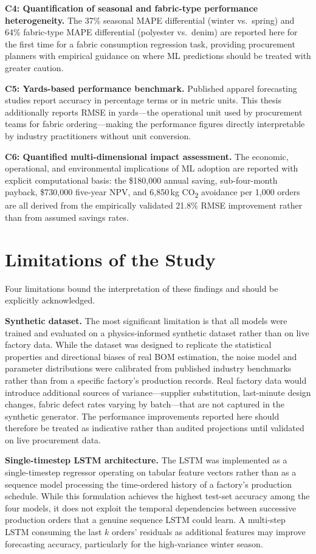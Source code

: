 \textbf{C4: Quantification of seasonal and fabric-type performance heterogeneity.} The 37\% seasonal MAPE differential (winter vs.\ spring) and 64\% fabric-type MAPE differential (polyester vs.\ denim) are reported here for the first time for a fabric consumption regression task, providing procurement planners with empirical guidance on where ML predictions should be treated with greater caution.

\textbf{C5: Yards-based performance benchmark.} Published apparel forecasting studies report accuracy in percentage terms or in metric units. This thesis additionally reports RMSE in yards---the operational unit used by procurement teams for fabric ordering---making the performance figures directly interpretable by industry practitioners without unit conversion.

\textbf{C6: Quantified multi-dimensional impact assessment.} The economic, operational, and environmental implications of ML adoption are reported with explicit computational basis: the \$180{,}000 annual saving, sub-four-month payback, \$730{,}000 five-year NPV, and 6{,}850\,kg CO\textsubscript{2} avoidance per 1{,}000 orders are all derived from the empirically validated 21.8\% RMSE improvement rather than from assumed savings rates.

\secdiv
\section{Limitations of the Study}
Four limitations bound the interpretation of these findings and should be explicitly acknowledged.

\textbf{Synthetic dataset.} The most significant limitation is that all models were trained and evaluated on a physics-informed synthetic dataset rather than on live factory data. While the dataset was designed to replicate the statistical properties and directional biases of real BOM estimation, the noise model and parameter distributions were calibrated from published industry benchmarks rather than from a specific factory's production records. Real factory data would introduce additional sources of variance---supplier substitution, last-minute design changes, fabric defect rates varying by batch---that are not captured in the synthetic generator. The performance improvements reported here should therefore be treated as indicative rather than audited projections until validated on live procurement data.

\textbf{Single-timestep LSTM architecture.} The LSTM was implemented as a single-timestep regressor operating on tabular feature vectors rather than as a sequence model processing the time-ordered history of a factory's production schedule. While this formulation achieves the highest test-set accuracy among the four models, it does not exploit the temporal dependencies between successive production orders that a genuine sequence LSTM could learn. A multi-step LSTM consuming the last $k$ orders' residuals as additional features may improve forecasting accuracy, particularly for the high-variance winter season.

